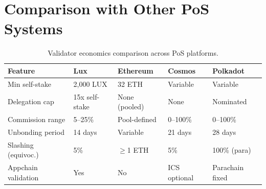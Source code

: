 \section{Comparison with Other PoS Systems}
\label{sec:comparison}

\begin{table}[H]
\centering
\caption{Validator economics comparison across PoS platforms.}
\label{tab:comparison}
\begin{tabular}{p{2.8cm}p{2.2cm}p{2.2cm}p{2.2cm}p{2.2cm}}
\toprule
\textbf{Feature} & \textbf{Lux} & \textbf{Ethereum} & \textbf{Cosmos} & \textbf{Polkadot} \\
\midrule
Min self-stake & 2,000 LUX & 32 ETH & Variable & Variable \\
Delegation cap & 15x self-stake & None (pooled) & None & Nominated \\
Commission range & 5--25\% & Pool-defined & 0--100\% & 0--100\% \\
Unbonding period & 14 days & Variable & 21 days & 28 days \\
Slashing (equivoc.) & 5\% & $\geq$1 ETH & 5\% & 100\% (para) \\
Appchain validation & Yes & No & ICS optional & Parachain fixed \\
\bottomrule
\end{tabular}
\end{table}


